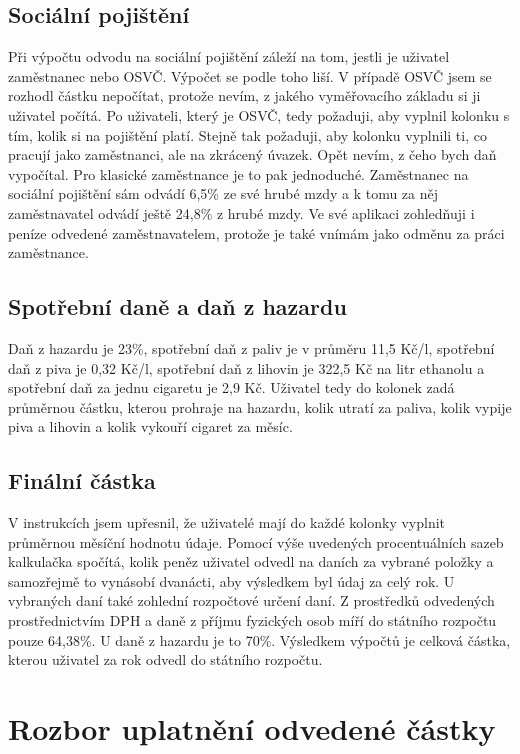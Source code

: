 \documentclass[11pt,a4paper,twoside,openright]{report}
\begin{document}
\subsection{Sociální pojištění}

Při výpočtu odvodu na sociální pojištění záleží na tom, jestli je uživatel zaměstnanec nebo OSVČ. Výpočet se podle toho liší. V případě OSVČ jsem se rozhodl částku nepočítat, protože nevím, z jakého vyměřovacího základu si ji uživatel počítá. Po uživateli, který je OSVČ, tedy požaduji, aby vyplnil kolonku s tím, kolik si na pojištění platí. Stejně tak požaduji, aby kolonku vyplnili ti, co pracují jako zaměstnanci, ale na zkrácený úvazek. Opět nevím, z čeho bych daň vypočítal. Pro klasické zaměstnance je to pak jednoduché. Zaměstnanec  na sociální pojištění sám odvádí 6,5\% ze své hrubé mzdy a k tomu za něj zaměstnavatel odvádí ještě 24,8\% z hrubé mzdy. Ve své aplikaci zohledňuji i peníze odvedené zaměstnavatelem, protože je také vnímám jako odměnu za práci zaměstnance.

\subsection{Spotřební daně a daň z hazardu}

Daň z hazardu je 23\%, spotřební daň z paliv je v průměru 11,5 Kč/l, spotřební daň z piva je 0,32 Kč/l, spotřební daň z lihovin je 322,5 Kč na litr ethanolu a spotřební daň za jednu cigaretu je 2,9 Kč. Uživatel tedy do kolonek zadá průměrnou částku, kterou prohraje na hazardu, kolik utratí za paliva, kolik vypije piva a lihovin a kolik vykouří cigaret za měsíc.

\subsection{Finální částka}

V instrukcích jsem upřesnil, že uživatelé mají do každé kolonky vyplnit průměrnou měsíční hodnotu údaje. Pomocí výše uvedených procentuálních sazeb kalkulačka spočítá, kolik peněz uživatel odvedl na daních za vybrané položky a samozřejmě to vynásobí dvanácti, aby výsledkem byl údaj za celý rok. U vybraných daní také zohlední rozpočtové určení daní. Z prostředků odvedených prostřednictvím DPH a daně z příjmu fyzických osob míří do státního rozpočtu pouze 64,38\%. U daně z hazardu je to 70\%. Výsledkem výpočtů je celková částka, kterou uživatel za rok odvedl do státního rozpočtu.

\section{Rozbor uplatnění odvedené částky}
\end{document}
